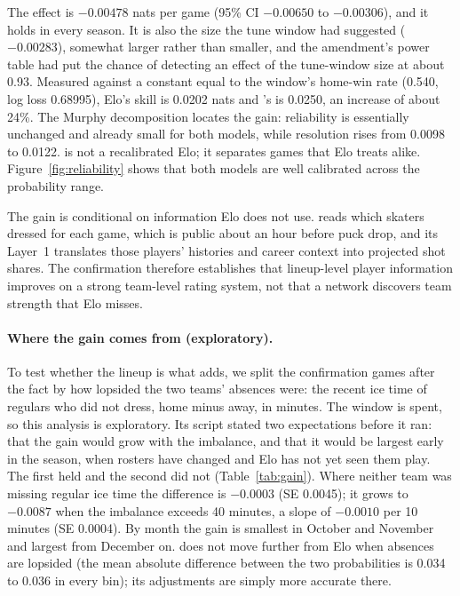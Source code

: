 The effect is $-0.00478$ nats per game (95\% CI $-0.00650$ to $-0.00306$), and it
holds in every season. It is also the size the tune window had suggested
($-0.00283$), somewhat larger rather than smaller, and the amendment's power
table had put the chance of detecting an effect of the tune-window size at
about 0.93. Measured against a constant equal to the window's home-win rate
(0.540, log loss 0.68995), Elo's skill is 0.0202 nats and \neurhlH{}'s is 0.0250, an
increase of about 24\%. The Murphy decomposition locates the gain: reliability
is essentially unchanged and already small for both models, while resolution
rises from 0.0098 to 0.0122. \neurhlH{} is not a recalibrated Elo; it separates
games that Elo treats alike. Figure~\ref{fig:reliability} shows that both
models are well calibrated across the probability range.

The gain is conditional on information Elo does not use. \neurhlH{} reads which
skaters dressed for each game, which is public about an hour before puck drop,
and its Layer~1 translates those players' histories and career context into
projected shot shares. The confirmation therefore establishes that lineup-level
player information improves on a strong team-level rating system, not that a
network discovers team strength that Elo misses.

\paragraph{Where the gain comes from (exploratory).}
To test whether the lineup is what \neurhlH{} adds, we split the confirmation
games after the fact by how lopsided the two teams' absences were: the recent
ice time of regulars who did not dress, home minus away, in minutes. The window
is spent, so this analysis is exploratory. Its script stated two expectations
before it ran: that the gain would grow with the imbalance, and that it would
be largest early in the season, when rosters have changed and Elo has not yet
seen them play. The first held and the second did not (Table~\ref{tab:gain}).
Where neither team was missing regular ice time the difference is $-0.0003$
(SE 0.0045); it grows to $-0.0087$ when the imbalance exceeds 40 minutes, a
slope of $-0.0010$ per 10 minutes (SE 0.0004). By month the gain is smallest
in October and November and largest from December on. \neurhlH{} does not move
further from Elo when absences are lopsided (the mean absolute difference
between the two probabilities is 0.034 to 0.036 in every bin); its adjustments
are simply more accurate there.

